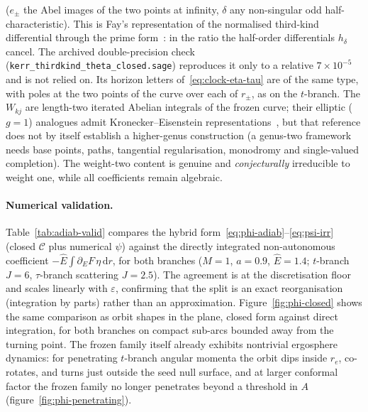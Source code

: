 \documentclass[12pt]{iopart}
\theoremstyle{plain}
\theoremstyle{definition}
\theoremstyle{remark}
\newcommand{\Ehat}{\hat E}
\newcommand{\dd}{\mathrm{d}}
\begin{document}
($e_\pm$ the Abel images of the two points at infinity, $\delta$ any non-singular odd
half-characteristic). This is Fay's representation of the normalised third-kind
differential through the prime form~\cite{Fay1973}: in the ratio the half-order
differentials $h_\delta$ cancel. The archived double-precision check
(\texttt{kerr\_thirdkind\_theta\_closed.sage}) reproduces it only to a relative
$7\times10^{-5}$ and is not relied on. Its horizon letters
of~\eqref{eq:clock-eta-tau} are of the same type, with poles at the two points of
the curve over each of $r_\pm$, as on the $t$-branch. The $W_{kj}$ are length-two iterated Abelian integrals of the frozen curve; their
elliptic ($g{=}1$) analogues admit Kronecker--Eisenstein
representations~\cite{BeilinsonLevin1994}, but that reference does not by itself
establish a higher-genus construction (a genus-two framework needs base points, paths,
tangential regularisation, monodromy and single-valued completion). The
weight-two content is genuine and \emph{conjecturally} irreducible to weight one, while
all coefficients remain
algebraic.

\paragraph{Numerical validation.} Table~\ref{tab:adiab-valid} compares the
hybrid form~\eqref{eq:phi-adiab}--\eqref{eq:psi-irr} (closed
$\mathcal{C}$ plus numerical $\psi$) against the directly integrated non-autonomous
coefficient $-\Ehat\!\int\partial_E F\,\eta\,\dd r$, for both branches
($M=1$, $a=0.9$, $\Ehat=1.4$; $t$-branch $J=6$, $\tau$-branch scattering $J=2.5$).
The agreement is at the discretisation floor and scales linearly with
$\varepsilon$, confirming that the split is an exact reorganisation (integration by
parts) rather than an approximation. Figure~\ref{fig:phi-closed} shows the same
comparison as orbit shapes in the plane, closed form against direct integration,
for both branches on compact sub-arcs bounded away from the turning point. The frozen family
itself already exhibits nontrivial ergosphere dynamics: for penetrating $t$-branch
angular momenta the orbit dips inside $r_e$, co-rotates, and turns just outside the
seed null surface, and at larger conformal factor the frozen family no longer penetrates beyond
a threshold in $A$ (figure~\ref{fig:phi-penetrating}).
\end{document}
